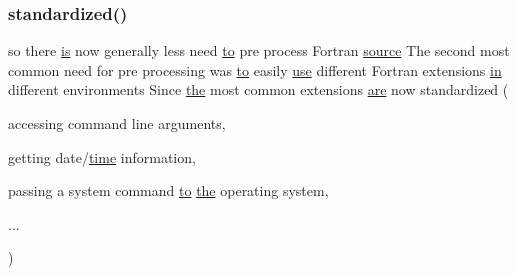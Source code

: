 \subsubsection{\texorpdfstring{standardized()}{standardized()}}
{\footnotesize\ttfamily so there \hyperlink{intro__blas1_83_8txt_a42a91df93f840595de3019ceb5d1df23}{is} now generally less need \hyperlink{M__stopwatch_83_8txt_a97209fd3e34ef701c0a9734280779cbb}{to} pre process Fortran \hyperlink{ufpp__overview_81_8txt_a4d6669ece605d05985c83a04dd38e0ad}{source} The second most common need for pre processing was \hyperlink{M__stopwatch_83_8txt_a97209fd3e34ef701c0a9734280779cbb}{to} easily \hyperlink{intro__blas1_83_8txt_a04fa2694d85f67a675bb3f45f7241f48}{use} different Fortran extensions \hyperlink{M__journal_83_8txt_afce72651d1eed785a2132bee863b2f38}{in} different environments Since \hyperlink{M__stopwatch_83_8txt_a0f266597de2e57eb3aa964927bb30e14}{the} most common extensions \hyperlink{M__stopwatch_83_8txt_a5040be02b832eba08820289c8a1f81c4}{are} now standardized (\begin{DoxyParamCaption}\item[{accessing command line}]{arguments,  }\item[{getting date/\hyperlink{M__stopwatch_83_8txt_a1091fdf3a4e66042d1571c7e4ade98dd}{time}}]{information,  }\item[{passing a system command \hyperlink{M__stopwatch_83_8txt_a97209fd3e34ef701c0a9734280779cbb}{to} \hyperlink{M__stopwatch_83_8txt_a0f266597de2e57eb3aa964927bb30e14}{the} operating}]{system,  }\item[{}]{... }\end{DoxyParamCaption})\hspace{0.3cm}{\ttfamily [new]}}

\mbox{\label{ufpp__overview_81_8txt_a97c20a96bcab81bc74c9d64b001f1202}} 
